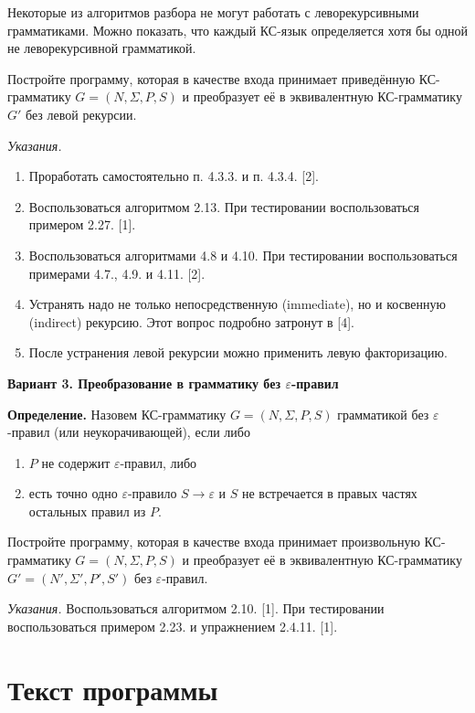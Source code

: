 \documentclass{bmstu-gost-7-32}
\begin{document}
Некоторые из алгоритмов разбора не могут работать с леворекурсивными грамматиками.
Можно показать, что каждый КС-язык определяется хотя бы одной не леворекурсивной грамматикой.

Постройте программу, которая в качестве входа принимает приведённую КС-грамматику $G = (N, \Sigma, P, S)$ и преобразует её в эквивалентную КС-грамматику $G'$ без левой рекурсии.

\textit{Указания.}
\begin{enumerate}
	\item Проработать самостоятельно п. 4.3.3. и п. 4.3.4. [2].
	\item Воспользоваться алгоритмом 2.13.
	При тестировании воспользоваться примером 2.27. [1].
	\item Воспользоваться алгоритмами 4.8 и 4.10.
	При тестировании воспользоваться примерами 4.7., 4.9. и 4.11. [2].
	\item Устранять надо не только непосредственную (immediate), но и косвенную (indirect) рекурсию.
	Этот вопрос подробно затронут в [4].
	\item После устранения левой рекурсии можно применить левую факторизацию.
\end{enumerate}

\textbf{Вариант 3. Преобразование в грамматику без $\varepsilon$-правил}

\textbf{Определение.}
Назовем КС-грамматику $G = (N, \Sigma, P, S)$ грамматикой без $\varepsilon$-правил (или неукорачивающей), если либо

\begin{enumerate}
	\item $P$ не содержит $\varepsilon$-правил, либо
	\item есть точно одно $\varepsilon$-правило $S \to \varepsilon$ и $S$ не встречается в правых частях остальных правил из $P$.
\end{enumerate}

Постройте программу, которая в качестве входа принимает произвольную КС-грамматику $G = (N, \Sigma, P, S)$ и преобразует её в эквивалентную КС-грамматику $G' = (N', \Sigma', P', S')$ без $\varepsilon$-правил.

\textit{Указания.}
Воспользоваться алгоритмом 2.10. [1].
При тестировании воспользоваться примером 2.23. и упражнением 2.4.11. [1].

\section*{Текст программы}
\end{document}
